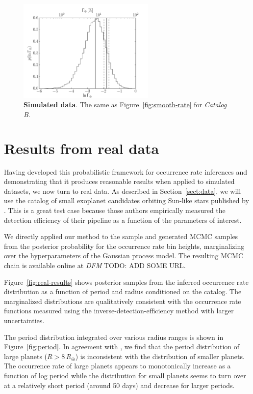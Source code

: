 \documentclass[12pt,preprint]{aastex}
\newcommand{\figref}[1]{\ref{fig:#1}}
\newcommand{\Fig}[1]{Figure~\figref{#1}}
\newcommand{\fig}[1]{\Fig{#1}}
\newcommand{\figlabel}[1]{\label{fig:#1}}
\newcommand{\Sect}[1]{Section~\ref{sect:#1}}
\newcommand{\sect}[1]{\Sect{#1}}
\newcommand{\todo}[3]{{\color{#2} \emph{#1} TODO: #3}}
\newcommand{\dfmtodo}[1]{\todo{DFM}{red}{#1}}
\newcommand{\modelb}{\emph{Catalog B}}
\begin{document}
\begin{figure}[p]
\begin{center}
\includegraphics[width=0.6\textwidth]{figures/simulation/rate.pdf}
\end{center}
\caption{%
{\bf Simulated data}.
The same as \fig{smooth-rate} for \modelb.
\figlabel{simulation-rate}}
\end{figure}

\section{Results from real data}

Having developed this probabilistic framework for occurrence rate inferences
and demonstrating that it produces reasonable results when applied to
simulated datasets, we now turn to real data.
As described in \sect{data}, we will use the catalog of small exoplanet
candidates orbiting Sun-like stars published by \citet{petigura}.
This is a great test case because those authors empirically measured the
detection efficiency of their pipeline as a function of the parameters of
interest.

We directly applied our method to the \citet{petigura} sample and generated
MCMC samples from the posterior probability for the occurrence rate bin
heights, marginalizing over the hyperparameters of the Gaussian process model.
The resulting MCMC chain is available online at \dfmtodo{ADD SOME URL}.

\Fig{real-results} shows posterior samples from the inferred occurrence rate
distribution as a function of period and radius conditioned on the catalog.
The marginalized distributions are qualitatively consistent with the
occurrence rate functions measured using the inverse-detection-efficiency
method with larger uncertainties.

The period distribution integrated over various radius ranges is shown in
\fig{period}.
In agreement with \citet{dong}, we find that the period distribution of large
planets ($R > 8\,R_\oplus$) is inconsistent with the distribution of smaller
planets.
The occurrence rate of large planets appears to monotonically increase as a
function of log period while the distribution for small planets seems to turn
over at a relatively short period (around 50 days) and decrease for larger
periods.
\end{document}

